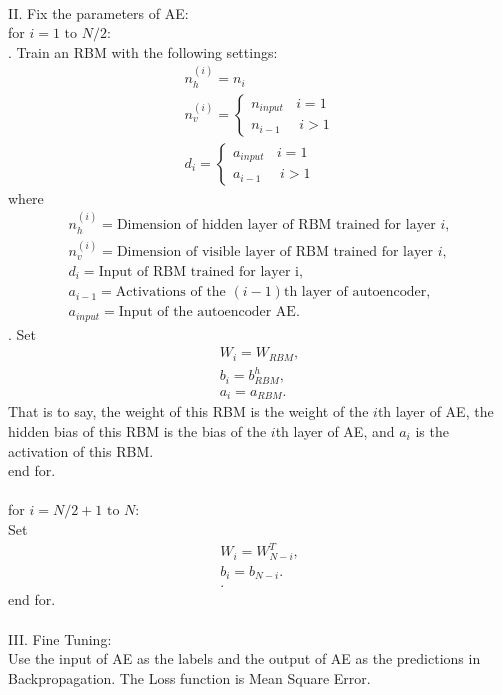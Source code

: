 \documentclass[12pt]{article}
\begin{document}
\\
II. Fix the parameters of AE:\\
for $i = 1\text{ to }N/2$:\\
. Train an RBM with the following settings:\\
\begin{gather}
n_h^{(i)}=n_i\\
n_v^{(i)}=\begin{cases}
n_{input}~~~~i=1\\
n_{i-1}~~~~~~i > 1
\end{cases}\\
d_i=\begin{cases}
a_{input}~~~~i=1\\
a_{i-1}~~~~~~i > 1
\end{cases}
\end{gather}
\indent where
\begin{gather}
n_h^{(i)} = \text{Dimension of hidden layer of RBM trained for layer }i,\\
n_v^{(i)} = \text{Dimension of visible layer of RBM trained for layer }i,\\
d_i = \text{Input of RBM trained for layer i},\\
a_{i-1} = \text{Activations of the }(i-1)\text{th layer of autoencoder},\\
a_{input} = \text{Input of the autoencoder AE}.
\end{gather}
. Set \begin{gather}
W_i = W_{RBM},\\
b_i = b^h_{RBM},\\
a_i = a_{RBM}.
\end{gather}
\indent That is to say, the weight of this RBM is the weight of the $i$th layer of AE, the hidden \indent bias of this RBM is the bias of the $i$th layer of AE, and $a_i$ is the activation of this RBM.\\
end for.\\
\\
for $i = N/2+1\text{ to }N$:\\
\indent Set \begin{gather}
W_i = W_{N - i}^{T},\\
b_i = b_{N-i}.\\.
\end{gather}
end for.\\
\\
III. Fine Tuning:\\
Use the input of AE as the labels and the output of AE as the predictions in Backpropagation. The Loss function is Mean Square Error.
\end{document}
